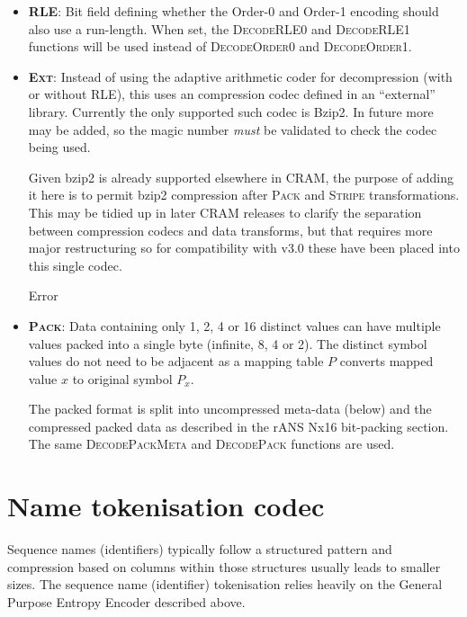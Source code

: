 \documentclass[a4paper]{article}
\begin{document}
\begin{itemize}
\item{\textbf{\textsc{RLE}}:}
Bit field defining whether the Order-0 and Order-1 encoding should also use a run-length.
When set, the \textsc{DecodeRLE0} and \textsc{DecodeRLE1} functions will be used instead of \textsc{DecodeOrder0} and \textsc{DecodeOrder1}.

\item{\textbf{\textsc{Ext}}:}
Instead of using the adaptive arithmetic coder for decompression (with or without RLE), this uses an compression codec defined in an ``external'' library.
Currently the only supported such codec is Bzip2.
In future more may be added, so the magic number \emph{must} be validated to check the codec being used.

Given bzip2 is already supported elsewhere in CRAM, the purpose of adding it here is to permit bzip2 compression after \textsc{Pack} and \textsc{Stripe} transformations.
This may be tidied up in later CRAM releases to clarify the separation between compression codecs and data transforms, but that requires more major restructuring so for compatibility with v3.0 these have been placed into this single codec.

\begin{algorithmic}[1]
    \State \Return {}
  \Else
    \State Error
  \EndIf
\EndFunction
\end{algorithmic}

\item{\textbf{\textsc{Pack}}:}
Data containing only 1, 2, 4 or 16 distinct values can have multiple
values packed into a single byte (infinite, 8, 4 or 2).  The distinct
symbol values do not need to be adjacent as a mapping table $P$
converts mapped value $x$ to original symbol $P_x$.

The packed format is split into uncompressed meta-data (below) and the
compressed packed data as described in the rANS Nx16 bit-packing section.
The same \textsc{DecodePackMeta} and \textsc{DecodePack} functions are used.

\end{itemize}

\section{Name tokenisation codec}

Sequence names (identifiers) typically follow a structured pattern and compression based on columns within those structures usually leads to smaller sizes.
The sequence name (identifier) tokenisation relies heavily on the General Purpose Entropy Encoder described above.
\end{document}
